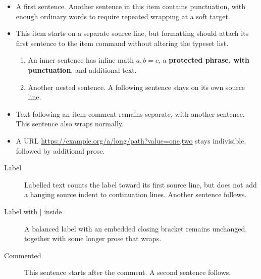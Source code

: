 \documentclass{article}
\begin{document}
\begin{itemize}
  \item A first sentence. Another sentence in this item contains punctuation, with enough ordinary words to require repeated wrapping at a soft target.
  \item
  This item starts on a separate source line, but formatting should attach its first sentence to the item command without altering the typeset list.
  \begin{enumerate}
    \item An inner sentence has inline math $a, b = c$, a \textbf{protected phrase, with punctuation}, and additional text.
    \item Another nested sentence. A following sentence stays on its own source line.
  \end{enumerate}
  \item %
  Text following an item comment remains separate, with another sentence. This sentence also wraps normally.
  \item A URL \url{https://example.org/a/long/path?value=one,two} stays indivisible, followed by additional prose.
\end{itemize}

\begin{description}
  \item[Label] Labelled text counts the label toward its first source line, but does not add a hanging source indent to continuation lines. Another sentence follows.
  \item[{Label with ] inside}] A balanced label with an embedded closing bracket remains unchanged, together with some longer prose that wraps.
  \item[Commented] %
  This sentence starts after the comment. A second sentence follows.
\end{description}
\end{document}
